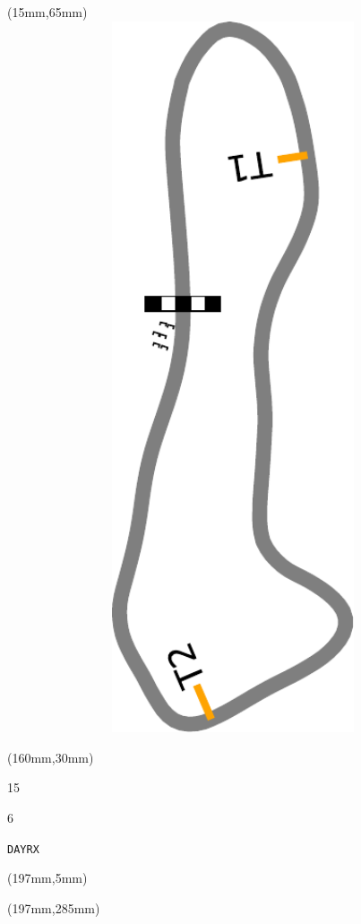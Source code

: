 \begin{textblock*}{185mm}(15mm,65mm)%
\centering
\mbox{\includegraphics[width=185mm,height=210mm,keepaspectratio]{PT/DAYRX.pdf}}
\end{textblock*}
\begin{textblock*}{40mm}(160mm,30mm)%
\Large
\par{} 
\par15 
\par6 
\par\hfill\tiny\tt DAYRX\\
\end{textblock*}
\begin{textblock*}{20mm}(197mm,5mm)%
\fbox{\thepage}
\label{DAYRX}
\end{textblock*}
\begin{textblock*}{20mm}(197mm,285mm)%
\fbox{\thepage}
\end{textblock*}

